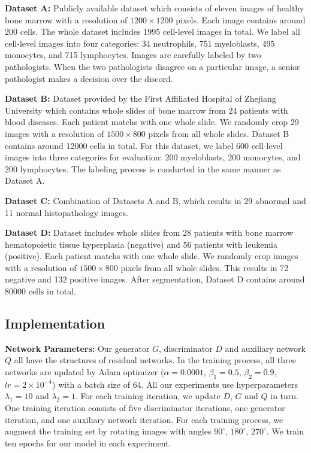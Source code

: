 \documentclass[journal]{IEEEtran}
\begin{document}
\textbf{Dataset A:} Publicly available dataset \cite{kainz2015you} which consists of eleven images of healthy bone marrow with a resolution of $1200 \times 1200$ pixels. Each image contains around 200 cells. The whole dataset includes 1995 cell-level images in total. We label all cell-level images into four categories: 34 neutrophils, 751 myeloblasts, 495 monocytes, and 715 lymphocytes. Images are carefully labeled by two pathologists. When the two pathologists disagree on a particular image, a senior pathologist makes a decision over the discord.

\textbf{Dataset B:} Dataset provided by the First Affiliated Hospital of Zhejiang University which contains whole slides of bone marrow from 24 patients with blood diseases. Each patient matchs with one whole slide. We randomly crop 29 images with a resolution of $1500 \times 800$ pixels from all whole slides. Dataset B contains around 12000 cells in total. For this dataset, we label 600 cell-level images into three categories for evaluation: 200 myeloblasts, 200 monocytes, and 200 lymphocytes. The labeling process is conducted in the same manner as Dataset A.

\textbf{Dataset C:} Combination of Datasets A and B, which results in 29 abnormal and 11 normal histopathology images.

\textbf{Dataset D:} Dataset includes whole slides from 28 patients with bone marrow hematopoietic tissue hyperplasia (negative) and 56 patients with leukemia (positive). Each patient matchs with one whole slide. We randomly crop images with a resolution of $1500 \times 800$ pixels from all whole slides. This results in 72 negative and 132 positive images. After segmentation, Dataset D contains around 80000 cells in total.
\subsection{Implementation}

\textbf{Network Parameters:} Our generator $G$, discriminator $D$ and auxiliary network $Q$ all have the structures of residual networks. In the training process, all three networks are updated by Adam optimizer ($\alpha=0.0001$, $\beta_1=0.5$, $\beta_2=0.9$, $lr=2 \times 10^{-4}$) \cite{kingma2014adam} with a batch size of 64. All our experiments use hyperparameters $\lambda_1 = 10$ and $\lambda _2 = 1$. For each training iteration, we update $D$, $G$ and $Q$ in turn. One training iteration consists of five discriminator iterations, one generator iteration, and one auxiliary network iteration. For each training process, we augment the training set by rotating images with angles $90^\circ$, $180^\circ$, $270^\circ$. We train ten epochs for our model in each experiment.
\end{document}
